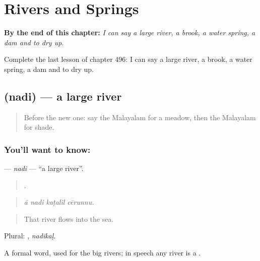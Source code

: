 
\chapter{Rivers and Springs}
\label{ch:ml-rivers-and-springs}

\begin{chapteropening}
\textbf{By the end of this chapter:} \emph{I can say a large river, a brook, a water spring, a dam and to dry up.}

Complete the last lesson of chapter 496: I can say a large river, a brook, a water spring, a dam and to dry up.
\end{chapteropening}

\section[\texorpdfstring{\ml{നദി} (nadi)}{നദി (nadi)}]{ (nadi) — a large river}

\label{lesson:ML-C496-nadi}



\begin{quote}
Before the new one: say the Malayalam for a meadow, then the Malayalam for shade.
\end{quote}

\subsection*{You'll want to know: }
\textbf{} — \emph{nadi} — \textquotedblleft{}a large river\textquotedblright{}.

\begin{quote}
   .
\end{quote}

\begin{quote}
\emph{ā nadi kaṭalil cērunnu.}
\end{quote}

\begin{quote}
That river flows into the sea.
\end{quote}

Plural: , \emph{nadikaḷ}.

A formal word, used for the big rivers; in speech any river is a .

